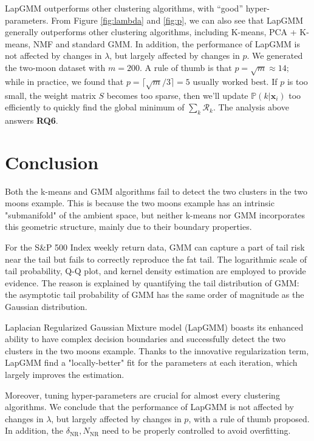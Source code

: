\documentclass[10pt,journal,compsoc]{IEEEtran}
\newcommand{\Prob}{\mathbb{P}}
\newcommand{\x}{\mathbf{x}}
\begin{document}
    LapGMM outperforms other clustering algorithms, with “good” hyper-parameters. From Figure \ref{fig:lambda} and \ref{fig:p}, we can also see that LapGMM generally outperforms other clustering algorithms, including K-means, PCA + K-means, NMF and standard GMM. 
    In addition, the performance of LapGMM is not affected by changes in $\lambda$, but largely affected by changes in $p$. We generated the two-moon dataset with $m = 200$. A rule of thumb is that $p = \sqrt{m} \approx 14$; while in practice, we found that $p = \lceil\sqrt{m}/3\rceil = 5$ usually worked best. If $p$ is too small, the weight matrix $S$ becomes too sparse, then we’ll update $\Prob(k | \x_i)$ too efficiently to quickly find the global minimum of $\sum_k\mathcal{R}_k$. The analysis above answers \textbf{RQ6}.


    

    


\section{Conclusion}\label{sec:conclusion}
Both the k-means and GMM algorithms fail to detect the two clusters in the two moons example. This is because the two moons example has an intrinsic "submanifold" of the ambient space, but neither k-means nor GMM incorporates this geometric structure, mainly due to their boundary properties. 

For the S\&P 500 Index weekly return data, GMM can capture a part of tail risk near the tail but fails to correctly reproduce the fat tail. The logarithmic scale of tail probability, Q-Q plot, and kernel density estimation are employed to provide evidence. The reason is explained by quantifying the tail distribution of GMM: the asymptotic tail probability of GMM has the same order of magnitude as the Gaussian distribution.

Laplacian Regularized Gaussian Mixture model (LapGMM) boasts its enhanced ability to have complex decision boundaries and successfully detect the two clusters in the two moons example. Thanks to the innovative regularization term, LapGMM find a "locally-better" fit for the parameters at each iteration, which largely improves the estimation. 

Moreover, tuning hyper-parameters are crucial for almost every clustering algorithms. We conclude that the performance of LapGMM is not affected by changes in $\lambda$, but largely affected by changes in $p$, with a rule of thumb proposed. In addition, the $\delta_{\mathrm{NR}}, N_{\mathrm{NR}}$ need to be properly controlled to avoid overfitting.
\end{document}
